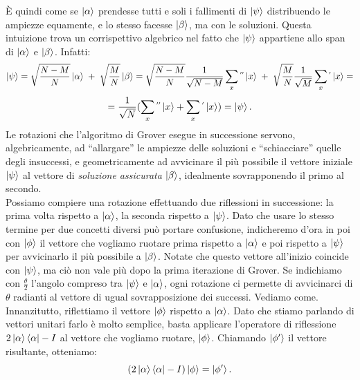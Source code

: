 \documentclass{book}
\theoremstyle{definition}
\theoremstyle{definition}
\theoremstyle{definition}
\theoremstyle{plain}
\theoremstyle{plain}
\theoremstyle{plain}
\theoremstyle{plain}
\begin{document}
È quindi come se $\ket{\alpha}$ prendesse tutti e soli i fallimenti di $\ket{\psi}$ distribuendo le ampiezze equamente, e lo stesso facesse $\ket{\beta}$, ma con le soluzioni. Questa intuizione trova un corrispettivo algebrico nel fatto che $\ket{\psi}$ appartiene allo span di $\ket{\alpha}$ e $\ket{\beta}$. Infatti:
\begin{displaymath}
\ket{\psi} = \sqrt{\frac{N-M}{N}} \ket{\alpha} \mkern5mu + \mkern5mu \sqrt{\frac{M}{N}} \ket{\beta} = \sqrt{\frac{N-M}{N}} \frac{1}{\sqrt{N-M}} \sum_{x}\mathop{}^{''}\ket{x} \mkern5mu + \mkern5mu \sqrt{\frac{M}{N}} \frac{1}{\sqrt{M}}\sum_{x}\mathop{}^{'}\ket{x} = 
\end{displaymath}
\begin{displaymath}
= \frac{1}{\sqrt{N}} ( \sum_{x}\mathop{}^{''}\ket{x} +  \sum_{x}\mathop{}^{'}\ket{x} ) = \ket{\psi}.
\end{displaymath}
Le rotazioni che l'algoritmo di Grover esegue in successione servono, algebricamente, ad ``allargare'' le ampiezze delle soluzioni e ``schiacciare'' quelle degli insuccessi, e geometricamente ad avvicinare il più possibile il vettore iniziale $\ket{\psi}$ al vettore di \emph{soluzione assicurata} $\ket{\beta}$, idealmente sovrapponendo il primo al secondo. \\
Possiamo compiere una rotazione effettuando due riflessioni in successione: la prima volta rispetto a $\ket{\alpha}$, la seconda rispetto a $\ket{\psi}$. Dato che usare lo stesso termine per due concetti diversi può portare confusione, indicheremo d'ora in poi con $\ket{\phi}$ il vettore che vogliamo ruotare prima rispetto a $\ket{\alpha}$ e poi rispetto a $\ket{\psi}$ per avvicinarlo il più possibile a $\ket{\beta}$. Notate che questo vettore all'inizio coincide con $\ket{\psi}$, ma ciò non vale più dopo la prima iterazione di Grover. %
Se indichiamo con $\frac{\theta}{2}$ l'angolo compreso tra $\ket{\psi}$ e $\ket{\alpha}$, ogni rotazione ci permette di avvicinarci di $\theta$ radianti al vettore di ugual sovrapposizione dei successi. Vediamo come. Innanzitutto, riflettiamo il vettore $\ket{\phi}$ rispetto a $\ket{\alpha}$. Dato che stiamo parlando di vettori unitari farlo è molto semplice, basta applicare l'operatore di riflessione $2\ket{\alpha}\bra{\alpha}-I$ al vettore che vogliamo ruotare, $\ket{\phi}$. Chiamando $\ket{\phi'}$ il vettore risultante, otteniamo:
\begin{displaymath}
(2\ket{\alpha}\bra{\alpha}-I) \ket{\phi} = \ket{\phi'}.
\end{displaymath}
\end{document}
